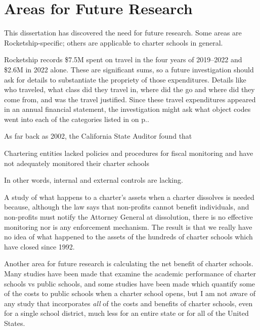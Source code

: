 \section{Areas for Future Research}%
\label{sec:areas-future-rese}\indent%

This dissertation has discovered the need for future research. Some areas are Rocketship-specific; others are applicable to charter schools in general.

Rocketship records \$7.5M spent on travel in the four years of 2019–2022 and \$2.6M in 2022 alone. These are significant sums, so a future investigation should ask for details to substantiate the propriety of those expenditures. Details like who traveled, what class did they travel in, where did the go and where did they come from, and was the travel justified. Since these travel expenditures appeared in an annual financial statement, the investigation might ask what object codes went into each of the categories listed in  on p.\pageref{tab:consolidated_functional_expenses}.

As far back as 2002, the California State Auditor found that
\begin{textquote}{Chartering entities lacked policies and procedures for fiscal monitoring and have not adequately monitored their charter schools}
\end{textquote}
In other words, internal and external controls are lacking.

A study of what happens to a charter's assets when a charter dissolves is needed because, although the law says that non-profits cannot benefit individuals, and non-profits must notify the Attorney General at dissolution, there is no effective monitoring nor is any enforcement mechanism. The result is that we really have no idea of what happened to the assets of the hundreds of charter schools which have closed since 1992.

Another area for future research is calculating the net benefit of charter schools. Many studies have been made that examine the academic performance of charter schools vs public schools, and some studies have been made which quantify some of the costs to public schools when a charter school opens, but I am not aware of any study that incorporates \textit{all} of the costs and benefits of charter schools, even for a single school district, much less for an entire state or for all of the United States.

